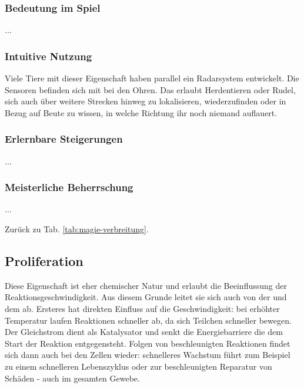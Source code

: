 \subsubsection{Bedeutung im Spiel}
...

\subsubsection{Intuitive Nutzung}
Viele Tiere mit dieser Eigenschaft haben parallel ein Radarsystem entwickelt.
Die Sensoren befinden sich mit bei den Ohren.
Das erlaubt Herdentieren oder Rudel, sich auch über weitere Strecken hinweg zu lokalisieren, wiederzufinden oder in Bezug auf Beute zu wissen, in welche Richtung ihr noch niemand auflauert.

\subsubsection{Erlernbare Steigerungen}
\begin{outline}
	\1 ...
\end{outline}

\subsubsection{Meisterliche Beherrschung} 
\begin{outline}
	\1 ...
\end{outline}
Zurück zu Tab. \ref{tab:magie-verbreitung}.



\subsection{Proliferation}\label{magie:proliferation}
Diese Eigenschaft ist eher chemischer Natur und erlaubt die Beeinflussung der Reaktionsgeschwindigkeit.
Aus diesem Grunde leitet sie sich auch von der  und dem  ab.
Ersteres hat direkten Einfluss auf die Geschwindigkeit: bei erhöhter Temperatur laufen Reaktionen schneller ab, da sich Teilchen schneller bewegen.
Der Gleichstrom dient als Katalysator und senkt die Energiebarriere die dem Start der Reaktion entgegensteht.
Folgen von beschleunigten Reaktionen findet sich dann auch bei den Zellen wieder: schnelleres Wachstum führt zum Beispiel zu einem schnelleren Lebenszyklus oder zur beschleunigten Reparatur von Schäden - auch im gesamten Gewebe.

